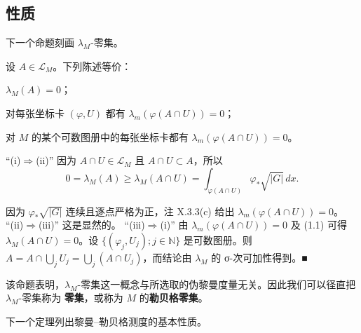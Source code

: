 \subsection*{性质}

下一个命题刻画 $ \lambda_M $-零集。

\begin{proposition}

设 $ A \in \mathcal{L}_M $。下列陈述等价：

\begin{subitems}
\item

$ \lambda_M(A) = 0 $；

\item

对每张坐标卡 $ (\varphi, U) $ 都有 $ \lambda_m(\varphi(A \cap U)) = 0 $；

\item

对 $ M $ 的某个可数图册中的每张坐标卡都有 $ \lambda_m(\varphi(A \cap U)) = 0 $。

\proofhead
“(i)$ \Rightarrow $(ii)” 因为 $ A \cap U \in \mathcal{L}_M $ 且 $ A \cap U \subset A $，所以
\[
0 = \lambda_M(A) \ge \lambda_M(A \cap U) = \int_{\varphi(A \cap U)} \varphi_*\sqrt{|G|} \, dx .
\]

因为 $ \varphi_*\sqrt{|G|} $ 连续且逐点严格为正，注 X.3.3(c) 给出 $ \lambda_m(\varphi(A \cap U)) = 0 $。
“(ii)$ \Rightarrow $(iii)” 这是显然的。
“(iii)$ \Rightarrow $(i)” 由 $ \lambda_m(\varphi(A \cap U)) = 0 $ 及 (1.1) 可得 $ \lambda_M(A \cap U) = 0 $。设 $ \{(\varphi_j, U_j) ; j \in \mathbb{N}\} $ 是可数图册。则 $ A = A \cap \bigcup_j U_j = \bigcup_j (A \cap U_j) $，而结论由 $ \lambda_M $ 的 σ-次可加性得到。\nobreak\hspace{0.35em}■

\end{subitems}

\end{proposition}

该命题表明，$ \lambda_M $-零集这一概念与所选取的伪黎曼度量无关。因此我们可以径直把 $ \lambda_M $-零集称为 \textbf{零集}，或称为 $ M $ 的\textbf{勒贝格零集}。

下一个定理列出黎曼–勒贝格测度的基本性质。

